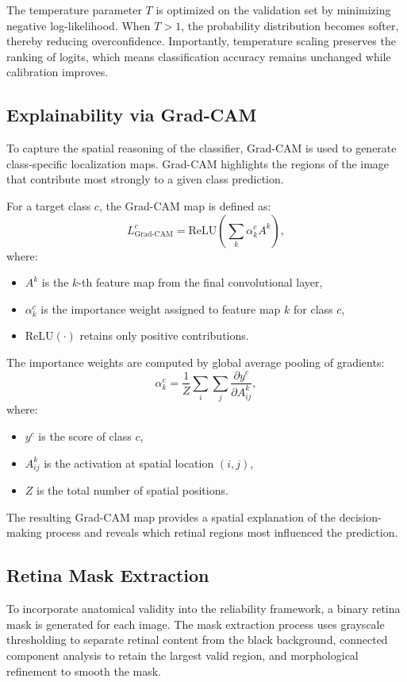 \documentclass[conference]{IEEEtran}
\begin{document}
The temperature parameter $T$ is optimized on the validation set by minimizing negative log-likelihood. When $T > 1$, the probability distribution becomes softer, thereby reducing overconfidence. Importantly, temperature scaling preserves the ranking of logits, which means classification accuracy remains unchanged while calibration improves.

\subsection{Explainability via Grad-CAM}
To capture the spatial reasoning of the classifier, Grad-CAM is used to generate class-specific localization maps. Grad-CAM highlights the regions of the image that contribute most strongly to a given class prediction.

For a target class $c$, the Grad-CAM map is defined as:
\begin{equation}
L_{\text{Grad-CAM}}^c = \text{ReLU}\left( \sum_{k} \alpha_k^c A^k \right),
\end{equation}
where:
\begin{itemize}
    \item $A^k$ is the $k$-th feature map from the final convolutional layer,
    \item $\alpha_k^c$ is the importance weight assigned to feature map $k$ for class $c$,
    \item $\text{ReLU}(\cdot)$ retains only positive contributions.
\end{itemize}

The importance weights are computed by global average pooling of gradients:
\begin{equation}
\alpha_k^c = \frac{1}{Z} \sum_{i}\sum_{j} \frac{\partial y^c}{\partial A^k_{ij}},
\end{equation}
where:
\begin{itemize}
    \item $y^c$ is the score of class $c$,
    \item $A^k_{ij}$ is the activation at spatial location $(i,j)$,
    \item $Z$ is the total number of spatial positions.
\end{itemize}

The resulting Grad-CAM map provides a spatial explanation of the decision-making process and reveals which retinal regions most influenced the prediction.

\subsection{Retina Mask Extraction}
To incorporate anatomical validity into the reliability framework, a binary retina mask is generated for each image. The mask extraction process uses grayscale thresholding to separate retinal content from the black background, connected component analysis to retain the largest valid region, and morphological refinement to smooth the mask.
\end{document}

